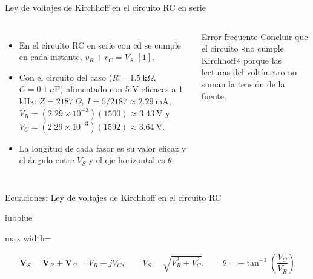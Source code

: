 \documentclass[aspectratio=169,11pt,xcolor={table}]{beamer}
\begin{document}
\begin{frame}{{\normalsize Ley de voltajes de Kirchhoff en el circuito RC en serie}}
\begin{columns}[c,onlytextwidth]
\small
\begin{itemize}\setlength{\itemsep}{4pt}
  \item En el circuito RC en serie con cd se cumple en cada instante, $v_R + v_C = V_S$ $[1]$.
  \item Con el circuito del caso ($R = 1.5\ \text{k}\Omega$, $C = 0.1\ \mu\text{F}$) alimentado con 5 V eficaces a 1 kHz: $Z = 2187\ \Omega$, $I = 5 / 2187 \approx 2.29\ \text{mA}$, $V_R = (2.29 \times 10^{-3})(1500) \approx 3.43\ \text{V}$ y $V_C = (2.29 \times 10^{-3})(1592) \approx 3.64\ \text{V}$.
  \item La longitud de cada fasor es su valor eficaz y el ángulo entre $V_S$ y el eje horizontal es $\theta$.
\end{itemize}
\begin{cardO}{Error frecuente}
\footnotesize Concluir que el circuito «no cumple Kirchhoff» porque las lecturas del voltímetro no suman la tensión de la fuente.
\end{cardO}
\end{columns}
\end{frame}

\begin{frame}{{\normalsize Ecuaciones: Ley de voltajes de Kirchhoff en el circuito RC}}
\begin{cajaplana}{iubblue}
\centering
\begin{adjustbox}{max width=\linewidth}
\begin{minipage}{1.30\linewidth}
{\large
\begin{equation*}
  \mathbf{V}_S = \mathbf{V}_R + \mathbf{V}_C = V_R - jV_C, \qquad V_S = \sqrt{V_R^{2} + V_C^{2}}, \qquad \theta = -\tan^{-1}\!\left(\frac{V_C}{V_R}\right)
\end{equation*}
}
\end{minipage}
\end{adjustbox}
\end{cajaplana}
\end{frame}
\end{document}
